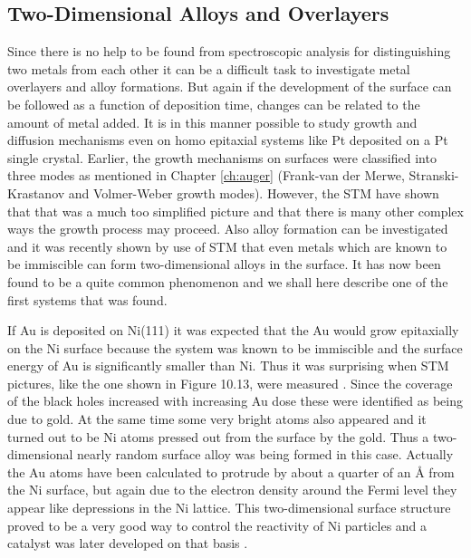 \vspace*{11cm}


\vspace{1cm} 

\subsection{Two-Dimensional Alloys and Overlayers}
Since there is no help to be found from spectroscopic analysis for distinguishing two metals from each other it can be a difficult task to investigate metal overlayers and alloy formations. But again if the development of the surface can be followed as a function of deposition time, changes can be related to the amount of metal added. It is in this manner possible to study growth and diffusion mechanisms even on homo epitaxial systems like Pt deposited on a Pt single crystal. Earlier, the  growth mechanisms on surfaces were classified into  three modes as  mentioned  in Chapter \ref{ch:auger} (Frank-van der Merwe, Stranski-Krastanov and Volmer-Weber growth modes). However, the STM have shown that that was a much too simplified picture and that there is many other complex ways the growth process may proceed. Also alloy formation can be investigated and it was recently shown by use of STM that even metals which are known to be immiscible can form two-dimensional alloys in the surface. It has now been found to be a quite common phenomenon \cite{Besenbacher2} and we shall here describe  one of the first systems that was found.

If Au is deposited on Ni(111) it was expected that the Au would grow epitaxially on the Ni surface because the system was known to be immiscible and the surface energy of Au is significantly smaller than Ni. Thus it was surprising when STM pictures, like the one shown in Figure 10.13, were measured \cite{Besenbacher3}. Since the coverage of the black holes increased with increasing Au dose these were identified as being due to gold. At the same time some very bright atoms also appeared and it turned out to be Ni atoms pressed out from the surface by the gold. Thus a two-dimensional nearly random surface alloy was being formed in this case. Actually the Au atoms have been calculated to protrude by about a quarter of an \si{\angstrom} from the Ni surface, but again due to the electron density around the Fermi level  they appear like depressions in the Ni lattice. This two-dimensional surface structure proved to be a very good way to control the  reactivity of Ni particles and a catalyst was later developed on that basis \cite{Science}.

